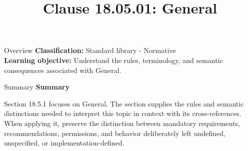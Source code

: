 \documentclass[10pt,letterpaper]{article}
\title{Clause 18.05.01: General}
\author{}
\date{}
\begin{document}
\maketitle
\begin{CornellOverviewBox}{Overview}
\textbf{Classification:} Standard library - Normative\\[2pt]
\textbf{Learning objective:} Understand the rules, terminology, and semantic consequences associated with General.
\end{CornellOverviewBox}\begin{CornellSummaryBox}{Summary}
{\sffamily\bfseries\color{Accent} Summary}\par\vspace{3pt}Section 18.5.1 focuses on General. The section supplies the rules and semantic distinctions needed to interpret this topic in context with its cross-references. When applying it, preserve the distinction between mandatory requirements, recommendations, permissions, and behavior deliberately left undefined, unspecified, or implementation-defined.
\end{CornellSummaryBox}
\end{document}
